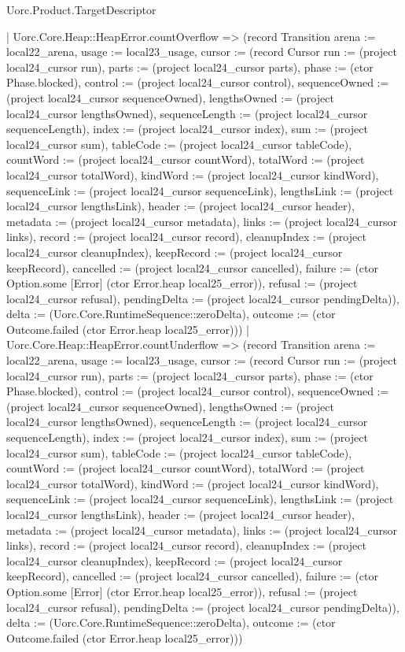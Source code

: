 \begin{lexlean}{Uorc.Product.TargetDescriptor}
\begin{semanticmodule}
{    | Uorc.Core.Heap::HeapError.countOverflow => (record Transition {arena := local22_arena, usage := local23_usage, cursor := (record Cursor {run := (project local24_cursor run), parts := (project local24_cursor parts), phase := (ctor Phase.blocked), control := (project local24_cursor control), sequenceOwned := (project local24_cursor sequenceOwned), lengthsOwned := (project local24_cursor lengthsOwned), sequenceLength := (project local24_cursor sequenceLength), index := (project local24_cursor index), sum := (project local24_cursor sum), tableCode := (project local24_cursor tableCode), countWord := (project local24_cursor countWord), totalWord := (project local24_cursor totalWord), kindWord := (project local24_cursor kindWord), sequenceLink := (project local24_cursor sequenceLink), lengthsLink := (project local24_cursor lengthsLink), header := (project local24_cursor header), metadata := (project local24_cursor metadata), links := (project local24_cursor links), record := (project local24_cursor record), cleanupIndex := (project local24_cursor cleanupIndex), keepRecord := (project local24_cursor keepRecord), cancelled := (project local24_cursor cancelled), failure := (ctor Option.some [Error] (ctor Error.heap local25_error)), refusal := (project local24_cursor refusal), pendingDelta := (project local24_cursor pendingDelta)}), delta := (Uorc.Core.RuntimeSequence::zeroDelta), outcome := (ctor Outcome.failed (ctor Error.heap local25_error))})
    | Uorc.Core.Heap::HeapError.countUnderflow => (record Transition {arena := local22_arena, usage := local23_usage, cursor := (record Cursor {run := (project local24_cursor run), parts := (project local24_cursor parts), phase := (ctor Phase.blocked), control := (project local24_cursor control), sequenceOwned := (project local24_cursor sequenceOwned), lengthsOwned := (project local24_cursor lengthsOwned), sequenceLength := (project local24_cursor sequenceLength), index := (project local24_cursor index), sum := (project local24_cursor sum), tableCode := (project local24_cursor tableCode), countWord := (project local24_cursor countWord), totalWord := (project local24_cursor totalWord), kindWord := (project local24_cursor kindWord), sequenceLink := (project local24_cursor sequenceLink), lengthsLink := (project local24_cursor lengthsLink), header := (project local24_cursor header), metadata := (project local24_cursor metadata), links := (project local24_cursor links), record := (project local24_cursor record), cleanupIndex := (project local24_cursor cleanupIndex), keepRecord := (project local24_cursor keepRecord), cancelled := (project local24_cursor cancelled), failure := (ctor Option.some [Error] (ctor Error.heap local25_error)), refusal := (project local24_cursor refusal), pendingDelta := (project local24_cursor pendingDelta)}), delta := (Uorc.Core.RuntimeSequence::zeroDelta), outcome := (ctor Outcome.failed (ctor Error.heap local25_error))})
}
\end{semanticmodule}
\end{lexlean}
